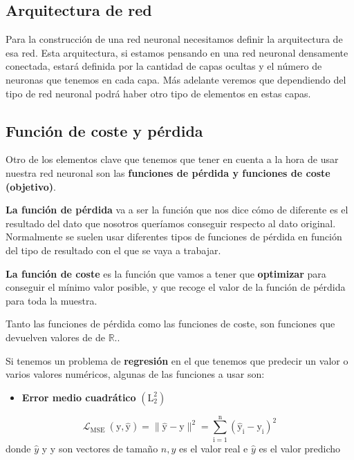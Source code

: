 \documentclass[
  a4paper,
  DIV=11,
  numbers=noendperiod]{scrreprt}
\providecommand{\tightlist}{%
  \setlength{\itemsep}{0pt}\setlength{\parskip}{0pt}}\usepackage{longtable,booktabs,array}
\begin{document}
\subsection{Arquitectura de red}\label{arquitectura-de-red}

Para la construcción de una red neuronal necesitamos definir la
arquitectura de esa red. Esta arquitectura, si estamos pensando en una
red neuronal densamente conectada, estará definida por la cantidad de
capas ocultas y el número de neuronas que tenemos en cada capa. Más
adelante veremos que dependiendo del tipo de red neuronal podrá haber
otro tipo de elementos en estas capas.

\subsection{Función de coste y
pérdida}\label{funciuxf3n-de-coste-y-puxe9rdida}

Otro de los elementos clave que tenemos que tener en cuenta a la hora de
usar nuestra red neuronal son las \textbf{funciones de pérdida y
funciones de coste (objetivo)}.

\textbf{La función de pérdida} va a ser la función que nos dice cómo de
diferente es el resultado del dato que nosotros queríamos conseguir
respecto al dato original. Normalmente se suelen usar diferentes tipos
de funciones de pérdida en función del tipo de resultado con el que se
vaya a trabajar.

\textbf{La función de coste} es la función que vamos a tener que
\textbf{optimizar} para conseguir el mínimo valor posible, y que recoge
el valor de la función de pérdida para toda la muestra.

Tanto las funciones de pérdida como las funciones de coste, son
funciones que devuelven valores de de \(\mathbb{R}\)..

Si tenemos un problema de \textbf{regresión} en el que tenemos que
predecir un valor o varios valores numéricos, algunas de las funciones a
usar son:

\begin{itemize}
\tightlist
\item
  \textbf{Error medio cuadrático} \(\left(\mathrm{L}_2^2\right)\)
\end{itemize}

\[
\mathcal{L}_{\text {MSE }}(\mathrm{y}, \hat{\mathrm{y}})=\|\hat{\mathrm{y}}-\mathrm{y}\|^2=\sum_{\mathrm{i}=1}^{\mathrm{n}}\left(\hat{\mathrm{y}}_{\mathrm{i}}-\mathrm{y}_{\mathrm{i}}\right)^2
\] donde \(\hat{y}\) y y son vectores de tamaño \(n, y\) es el valor
real e \(\hat{y}\) es el valor predicho
\end{document}
